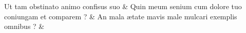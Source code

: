 \documentclass[12pt,onecolumn,twoside,a4paper]{memoir}
\begin{document}
               \begin{pairs}
                  \begin{Leftside}
			\beginnumbering
			\setcounter{stanzaL}{0}
                     
                         \stanza {}
                     Ut
                              tam
                              obstinato
                              animo
                              confisus
                              suo \&
                         \stanza {}
                     Quin
                              meum
                              senium
                              cum
                              dolore
                              tuo
                              coniungam
                              et
                              comparem
                              ? \&
                         \stanza {}
                     An
                              mala
                              ætate
                              mavis
                              male
                              mulcari
                              exemplis
                              omnibus
                              ? \&
                         \stanza {}
                     

\end{Leftside}
\end{pairs}
\end{document}
